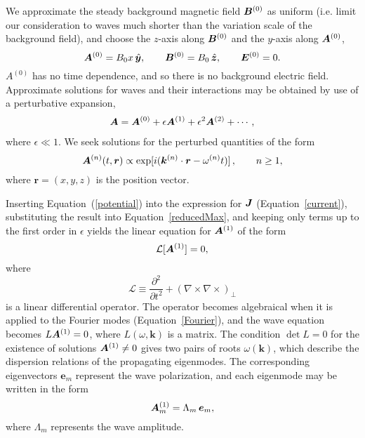 We approximate the steady background magnetic field $\boldsymbol{B}^{(0)}$ as uniform (i.e. limit our consideration to waves much shorter than the variation scale of the background field), and choose the $z$-axis along $\boldsymbol{B}^{(0)}$ and the $y$-axis along $\boldsymbol{A}^{(0)}$,
%
\begin{equation}
  \boldsymbol{A}^{(0)}=B_{0}x\,\hat{\boldsymbol{y}}, \qquad 
 \boldsymbol{B}^{(0)} = B_{0}\, \hat{\boldsymbol{z}},   \qquad \boldsymbol{E}^{(0)}=0.
\end{equation} 
%
$A^{(0)}$ has no time dependence, and so there is no background electric field.
Approximate solutions for waves and their interactions may be obtained by use of a perturbative expansion,
%
\begin{eqnarray}\label{pert}
	\boldsymbol{A} = \boldsymbol{A}^{(0)}
    +\epsilon \boldsymbol{A}^{(1)}+\epsilon^2\boldsymbol{A}^{(2)}+\cdots,
\end{eqnarray}
%
where $\epsilon\ll 1$.
We seek solutions for the perturbed quantities of the form 
%
\begin{equation}
\label{Fourier}
\boldsymbol{A}^{(n)}(t,\boldsymbol{r}) \propto \exp[i(\boldsymbol{k}^{(n)} \cdot \boldsymbol{r} - \omega^{(n)} t)]\, ,
 \qquad n\geq 1,
\end{equation}
%
where $\boldsymbol{r}=(x,y,z)$ is the position vector.

Inserting Equation~(\ref{potential}) into the expression for $\boldsymbol{J}$ (Equation~\ref{current}), substituting the result into Equation~\ref{reducedMax}, and keeping only terms up to the first order in $\epsilon$ yields the  linear equation for $\boldsymbol{A}^{(1)}$ of the form
%
\begin{equation}\label{Maxwell1}
   \mathcal{L}[\boldsymbol{A}^{(1)}]=0,
\end{equation} 
%
where 
%
\begin{equation}
  \mathcal{L}\equiv \frac{\partial^2}{\partial t^2} + (\nabla\times \nabla\times)_\perp
\end{equation}
%
is a linear differential operator. The operator becomes algebraical when it is applied to the Fourier modes (Equation~\ref{Fourier}), and the wave equation becomes $L\boldsymbol{A}^{(1)}=0$, where $L(\omega,\boldsymbol{k})$ is a matrix. The condition $\det L=0$ for the existence of solutions $\boldsymbol{A}^{(1)}\neq 0$ gives two pairs of roots $\omega(\boldsymbol{k})$, which describe the dispersion relations of the propagating eigenmodes. The corresponding eigenvectors $\boldsymbol{e}_m$ represent the wave polarization, and each eigenmode may be written in the form
%
\begin{equation}
  \boldsymbol{A}^{(1)}_m=\Lambda_m\,\boldsymbol{e}_m,
\end{equation}
%
where $\Lambda_m$ represents the wave amplitude.


